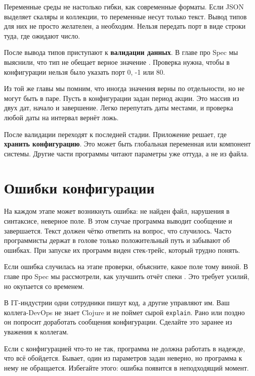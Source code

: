 Переменные среды не настолько гибки, как современные форматы. Если JSON выделяет
скаляры и коллекции, то переменные несут только текст. Вывод типов для них не
просто желателен, а необходим. Нельзя передать порт в виде строки туда, где
ожидают число.


После вывода типов приступают к \textbf{валидации данных}. В главе про Spec мы
выяснили, что тип не обещает верное значение .
Проверка нужна, чтобы в конфигурации нельзя было указать порт 0, -1 или 80.

Из той же главы мы помним, что иногда значения верны по отдельности, но не могут
быть в паре. Пусть в конфигурации задан период акции. Это массив из двух дат,
начало и завершение. Легко перепутать даты местами, и проверка любой даты
на интервал вернёт ложь.

После валидации переходят к последней стадии. Приложение решает, где
\textbf{хранить конфигурацию}. Это может быть глобальная переменная или
компонент системы. Другие части программы читают параметры уже оттуда, а не из
файла.

\section{Ошибки конфигурации}


На каждом этапе может возникнуть ошибка: не найден файл, нарушения в синтаксисе,
неверное поле. В этом случае программа выводит сообщение и завершается.
Текст должен чётко ответить на вопрос, что случилось. Часто программисты
держат в голове только положительный путь и забывают об ошибках. При запуске
их программ виден стек-трейс, который трудно понять.

Если ошибка случилась на этапе проверки, объясните, какое поле тому виной. В
главе про Spec мы рассмотрели, как улучшить отчёт спеки .
Это требует усилий, но окупается со временем.


В IT-индустрии одни сотрудники пишут код, а другие управляют им. Ваш
коллега-DevOps не знает Clojure и не поймет сырой \verb|explain|. Рано или
поздно он попросит доработать сообщения конфигурации. Сделайте это заранее из
уважения к коллегам.

Если с конфигурацией что-то не так, программа не должна работать в надежде, что
всё обойдется. Бывает, один из параметров задан неверно, но программа к нему не
обращается. Избегайте этого: ошибка появится в неподходящий момент.

